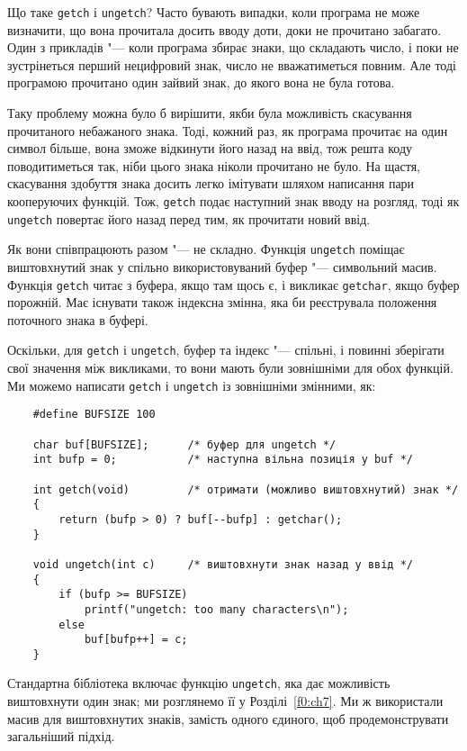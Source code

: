 \documentclass[a4paper,12pt]{book}
\begin{document}
  Що таке \texttt{getch} і \texttt{ungetch}? Часто бувають випадки, коли програма не може
  визначити, що вона прочитала досить вводу доти, доки не прочитано забагато. Один з
  прикладів "--- коли програма збирає знаки, що складають число, і поки не зустрінеться
  перший нецифровий знак, число не вважатиметься повним. Але тоді програмою прочитано
  один зайвий знак, до якого вона не була готова.

  Таку проблему можна було б вирішити, якби була можливість скасування прочитаного
  небажаного знака. Тоді, кожний раз, як програма прочитає на один символ більше, вона
  зможе відкинути його назад на ввід, тож решта коду поводитиметься так, ніби цього знака
  ніколи прочитано не було. На щастя, скасування здобуття знака досить легко імітувати
  шляхом написання пари кооперуючих функцій. Тож, \texttt{getch} подає наступний знак
  вводу на розгляд, тоді як \texttt{ungetch} повертає його назад перед тим, як прочитати
  новий ввід.

  Як вони співпрацюють разом "--- не складно. Функція \texttt{ungetch} поміщає
  виштовхнутий знак у спільно використовуваний буфер "--- символьний масив. Функція
  \texttt{getch} читає з буфера, якщо там щось є, і викликає \texttt{getchar}, якщо буфер
  порожній. Має існувати також індексна змінна, яка би реєструвала положення поточного
  знака в буфері.

  Оскільки, для \texttt{getch} і \texttt{ungetch}, буфер та індекс "--- спільні, і
  повинні зберігати свої значення між викликами, то вони мають були зовнішніми для обох
  функцій. Ми можемо написати \texttt{getch} і \texttt{ungetch} із зовнішніми змінними,
  як:
  \begin{verbatim}
    #define BUFSIZE 100

    char buf[BUFSIZE];      /* буфер для ungetch */
    int bufp = 0;           /* наступна вільна позиція у buf */

    int getch(void)         /* отримати (можливо виштовхнутий) знак */
    {
        return (bufp > 0) ? buf[--bufp] : getchar();
    }

    void ungetch(int c)     /* виштовхнути знак назад у ввід */
    {
        if (bufp >= BUFSIZE)
            printf("ungetch: too many characters\n");
        else
            buf[bufp++] = c;
    }
  \end{verbatim}

  Стандартна бібліотека включає функцію \texttt{ungetch}, яка дає можливість виштовхнути
  один знак; ми розглянемо її у Розділі~\ref{f0:ch7}. Ми ж використали масив для
  виштовхнутих знаків, замість одного єдиного, щоб продемонструвати загальніший підхід.
\end{document}
